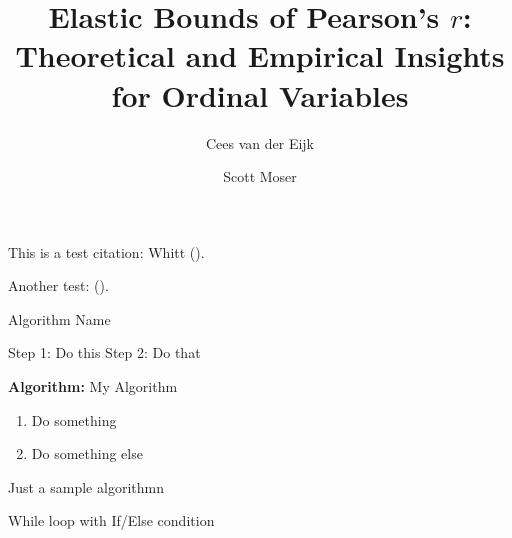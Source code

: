 \documentclass[
  12pt,
]{article}
\title{Elastic Bounds of Pearson's \(r\): Theoretical and Empirical
Insights for Ordinal Variables}
\author{Cees van der Eijk \and Scott Moser}
\date{}
\newenvironment{Shaded}{\begin{snugshade}}{\end{snugshade}}
\newcommand{\NormalTok}[1]{\textcolor[rgb]{0.00,0.23,0.31}{#1}}
\providecommand{\tightlist}{%
  \setlength{\itemsep}{0pt}\setlength{\parskip}{0pt}}\usepackage{longtable,booktabs,array}
\renewcommand*\contentsname{Table of contents}
\newcommand\contentsname{Table of contents}
\begin{document}
\maketitle

\renewcommand*\contentsname{Table of contents}
{
\hypersetup{linkcolor=}
\setcounter{tocdepth}{3}
\tableofcontents
}

This is a test citation: Whitt ().

Another test: ().

\begin{Shaded}
\begin{Highlighting}[]
\NormalTok{Algorithm Name}

\NormalTok{Step 1: Do this  }
\NormalTok{Step 2: Do that  }
\end{Highlighting}
\end{Shaded}

\textbf{Algorithm:} My Algorithm

\begin{enumerate}
\def\labelenumi{\arabic{enumi}.}
\tightlist
\item
  Do something\\
\item
  Do something else\\
\end{enumerate}

Just a sample algorithmn

\begin{algorithm}[H]
\DontPrintSemicolon
\SetAlgoLined
{}
\BlankLine
{}
\caption{While loop with If/Else condition}
\end{algorithm}

\newpage
\end{document}
